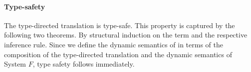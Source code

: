 \paragraph{Type-safety}
The type-directed translation is type-safe. This property is captured
by the following two theorems.
{By structural induction on the term and the respective inference rule.}
\vspace{-0.2cm}
{Since we define the dynamic semantics of \name in terms of the composition of
  the type-directed translation and the dynamic semantics of System $F$, type safety follows immediately.}
%
%
%




